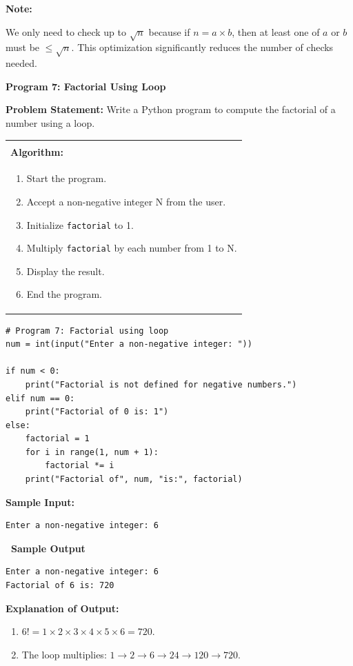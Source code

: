 \documentclass[12pt,a4paper]{article}
\makeatletter
\newcommand{\outhead}{\noindent\colorbox{cmrgreen!25}%
  {\textbf{\small\color{cmrdark}~Sample Output~}}\par\vspace{-1pt}}
\newenvironment{notebox}{%
  \par\vspace{4pt}%
  \noindent\textbf{Note:}\par\vspace{2pt}%
  \begin{minipage}{\linewidth}%
  \small%
}{%
  \end{minipage}\par\vspace{4pt}%
}
\newenvironment{algobox}{%
  \par\vspace{4pt}%
  \noindent\begin{tabular}{@{}p{\linewidth}@{}}%
  \hline\\[-8pt]%
  \textbf{\color{blue!60!black}\small Algorithm:}\\[2pt]%
}{%
  \\[-4pt]\hline%
  \end{tabular}\par\vspace{4pt}%
}
\makeatother
\begin{document}
\begin{notebox}
We only need to check up to $\sqrt{n}$ because if $n = a \times b$, then at least one of $a$ or $b$ must be $\leq \sqrt{n}$. This optimization significantly reduces the number of checks needed.
\end{notebox}

\vspace{0.5cm}

\textbf{Program 7: Factorial Using Loop}

\textbf{Problem Statement:}
Write a Python program to compute the factorial of a number using a loop.

\begin{algobox}
\begin{enumerate}[label=Step \arabic*:]
  \item Start the program.
  \item Accept a non-negative integer N from the user.
  \item Initialize \texttt{factorial} to 1.
  \item Multiply \texttt{factorial} by each number from 1 to N.
  \item Display the result.
  \item End the program.
\end{enumerate}
\end{algobox}

\begin{lstlisting}
# Program 7: Factorial using loop
num = int(input("Enter a non-negative integer: "))

if num < 0:
    print("Factorial is not defined for negative numbers.")
elif num == 0:
    print("Factorial of 0 is: 1")
else:
    factorial = 1
    for i in range(1, num + 1):
        factorial *= i
    print("Factorial of", num, "is:", factorial)
\end{lstlisting}

\textbf{Sample Input:}
\begin{verbatim}
Enter a non-negative integer: 6
\end{verbatim}

\outhead
\begin{lstlisting}[style=outputstyle]
Enter a non-negative integer: 6
Factorial of 6 is: 720
\end{lstlisting}

\textbf{Explanation of Output:}
\begin{enumerate}
  \item $6! = 1 \times 2 \times 3 \times 4 \times 5 \times 6 = 720$.
  \item The loop multiplies: $1 \to 2 \to 6 \to 24 \to 120 \to 720$.
\end{enumerate}
\end{document}
